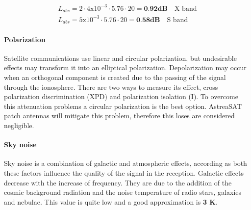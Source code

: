 \begin{align*}
	L_{abs}=2\cdot4\mathrm{x}10^{-3}\cdot5.76\cdot20 =\textbf{0.92dB} \quad \text{X band}\\
	L_{abs}=5\mathrm{x}10^{-3}\cdot5.76\cdot20 =\textbf{0.58dB} \quad \text{S band}
\end{align*}

\paragraph{Polarization} Satellite communications use linear and circular polarization, but undesirable effects may transform it into an elliptical polarization. Depolarization may occur when an orthogonal component is created due to the passing of the signal through the ionosphere. There are two ways to measure its effect, cross polarization discrimination (XPD) and polarization isolation (I)\cite{Jorge2012}. To overcome this attenuation problems a circular polarization is the best option. AstreaSAT patch antennas will mitigate this problem, therefore this loses are considered negligible.

\paragraph{Sky noise} Sky noise is a combination of galactic and atmospheric effects, according as both these factors influence the quality of the signal in the reception. Galactic effects decrease with the increase of frequency. They are due to the addition of the cosmic background radiation and the noise temperature of radio stars, galaxies and nebulae. This value is quite low and a good approximation is \textbf{3 K}.

